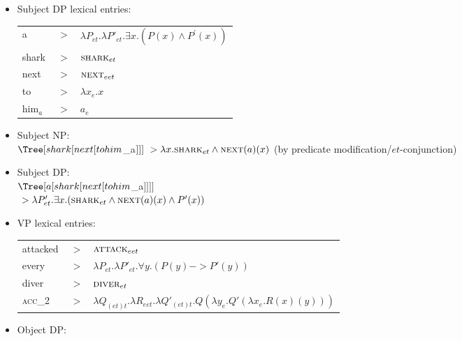 \documentclass[a4paper]{article}
\begin{document}
\begin{itemize}
	\item Subject DP lexical entries:\\

	\begin{tabular}{l c l}
		a 	 	& $~>$ 	& $\lambda P_{et}.\lambda P'_{et}.\exists x.(P(x) \land P^\prime(x))$ \\
		shark 	& $~>$ 	& $\textsc{shark}_{et}$\\
		next 	& $~>$ 	& $\textsc{next}_{eet}$\\
		to  	& $~>$ 	& $\lambda x_e.x$\\
		him$_a$	& $~>$ 	& $a_e$\\
	\end{tabular}



	\item Subject NP:\\

	$\Tree [shark [next [to him$_a$ ] ] ]  ~> \lambda x.\textsc{shark}_{et} \land \textsc{next}(a)(x)$ {\small(by predicate modification/$et$-conjunction)}



	\item Subject DP:\\

	$\Tree [a [shark [next [to him$_a$ ] ] ] ]$\\
	$~> \lambda P'_{et}.\exists x.(\textsc{shark}_{et} \land \textsc{next}(a)(x) \land P^\prime(x))$ 



	\item VP lexical entries:\\

	\begin{tabular}{l c l}
	  attacked 			& $~>$ 	& $\textsc{attack}_{eet}$\\
	  every 			& $~>$ 	& $\lambda P_{et}.\lambda P'_{et}.\forall y.(P(y) -> P'(y))$\\
	  diver 			& $~>$ 	& $\textsc{diver}_{et}$\\
	  \textsc{acc}_2 	& $~>$ 	& $\lambda Q_{(et)t}.\lambda R_{eet}. \lambda Q'_{(et)t}.Q(\lambda y_e.Q'(\lambda x_e.R(x)(y)))$\\
	\end{tabular}



	\item Object DP:\\


\end{itemize}
\end{document}
